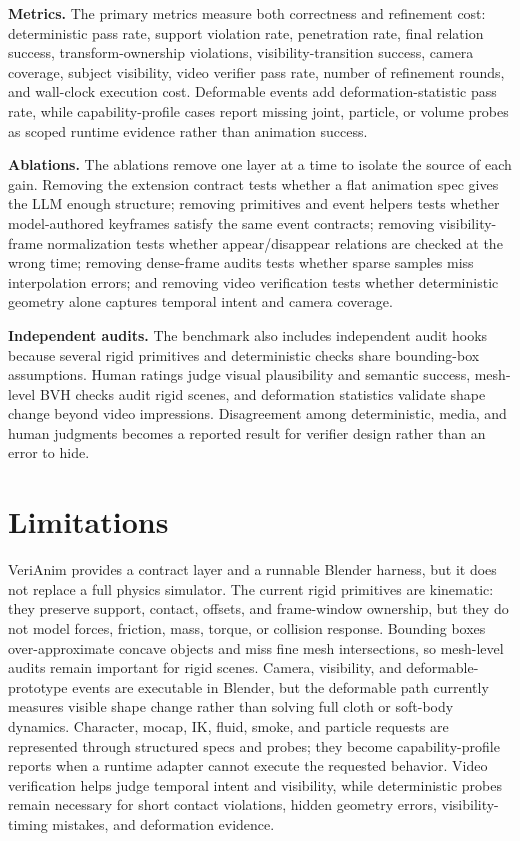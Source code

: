 \documentclass{article}
\begin{document}
\textbf{Metrics.}
The primary metrics measure both correctness and refinement cost: deterministic pass rate, support violation rate, penetration rate, final relation success, transform-ownership violations, visibility-transition success, camera coverage, subject visibility, video verifier pass rate, number of refinement rounds, and wall-clock execution cost. Deformable events add deformation-statistic pass rate, while capability-profile cases report missing joint, particle, or volume probes as scoped runtime evidence rather than animation success.

\textbf{Ablations.}
The ablations remove one layer at a time to isolate the source of each gain. Removing the extension contract tests whether a flat animation spec gives the LLM enough structure; removing primitives and event helpers tests whether model-authored keyframes satisfy the same event contracts; removing visibility-frame normalization tests whether appear/disappear relations are checked at the wrong time; removing dense-frame audits tests whether sparse samples miss interpolation errors; and removing video verification tests whether deterministic geometry alone captures temporal intent and camera coverage.

\textbf{Independent audits.}
The benchmark also includes independent audit hooks because several rigid primitives and deterministic checks share bounding-box assumptions. Human ratings judge visual plausibility and semantic success, mesh-level BVH checks audit rigid scenes, and deformation statistics validate shape change beyond video impressions. Disagreement among deterministic, media, and human judgments becomes a reported result for verifier design rather than an error to hide.

\section{Limitations}

VeriAnim provides a contract layer and a runnable Blender harness, but it does not replace a full physics simulator. The current rigid primitives are kinematic: they preserve support, contact, offsets, and frame-window ownership, but they do not model forces, friction, mass, torque, or collision response. Bounding boxes over-approximate concave objects and miss fine mesh intersections, so mesh-level audits remain important for rigid scenes. Camera, visibility, and deformable-prototype events are executable in Blender, but the deformable path currently measures visible shape change rather than solving full cloth or soft-body dynamics. Character, mocap, IK, fluid, smoke, and particle requests are represented through structured specs and probes; they become capability-profile reports when a runtime adapter cannot execute the requested behavior. Video verification helps judge temporal intent and visibility, while deterministic probes remain necessary for short contact violations, hidden geometry errors, visibility-timing mistakes, and deformation evidence.
\end{document}
